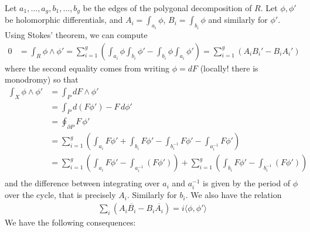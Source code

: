 \documentclass[12pt]{article}
\begin{document}
Let $a_1, \ldots, a_g, b_1, \ldots, b_g$ be the edges of the polygonal decomposition of $R$. Let $\phi, \phi'$ be holomorphic differentials, and $A_i = \int_{a_i} \phi$, $B_i = \int_{b_i} \phi$ and similarly for $\phi'$. Using Stokes' theorem, we can compute \begin{align*}
    0 & = \int_R \phi \wedge \phi' = \sum_{i=1}^g \left( \int_{a_i} \phi \int_{b_i} \phi' - \int_{b_i} \phi \int_{a_i} \phi' \right) = \sum_{i=1}^g (A_i B_i' - B_i A_i')
\end{align*} where the second equality comes from writing $\phi = dF$ (locally! there is monodromy) so that \begin{align*}
    \int_X \phi \wedge \phi' & = \int_P dF\wedge\phi'                                                                                                                               \\
                             & = \int_P d(F\phi')-F\,d\phi'                                                                                                                         \\
                             & = \oint_{\partial P} F\,\phi'                                                                                                                        \\
                             & = \sum_{i=1}^g \left( \int_{a_i} F\phi' + \int_{b_i} F\phi' - \int_{b_i^{-1}} F\phi' - \int_{a_i^{-1}} F\phi' \right)                                \\
                             & = \sum_{i=1}^g \left( \int_{a_i}F\phi' - \int_{a_i^{-1}} (F\phi') \right) + \sum_{i=1}^g \left( \int_{b_i} F\phi' - \int_{b_i^{-1}} (F\phi') \right) \\
\end{align*} and the difference between integrating over $a_i$ and $a_i^{-1}$ is given by the period of $\phi$ over the cycle, that is precisely $A_i$. Similarly for $b_i$.
We also have the relation \begin{align*}
    \sum_i (A_i \overline{B_i} - B_i \overline{A_i}) = i\langle\phi, \phi'\rangle
\end{align*}
We have the following consequences:
\end{document}
